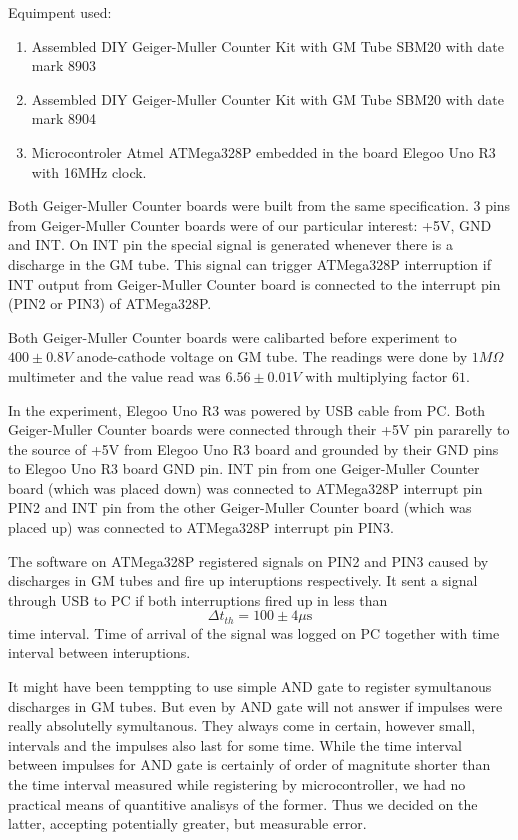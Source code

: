\documentclass[main.tex]{subfiles}
\begin{document}
 
Equimpent used:
\begin{enumerate}
\item Assembled DIY Geiger-Muller Counter Kit with GM Tube SBM20 with date mark 8903 
\item Assembled DIY Geiger-Muller Counter Kit with GM Tube SBM20 with date mark 8904
\item Microcontroler Atmel ATMega328P embedded in the board Elegoo Uno R3 with 16MHz clock.
\end{enumerate}

Both Geiger-Muller Counter boards were built from the same specification. 3 pins from Geiger-Muller Counter boards were of our particular interest: +5V, GND and INT. On INT pin the special signal is generated whenever there is a discharge in the GM tube. This signal can trigger ATMega328P interruption if INT output from Geiger-Muller Counter board is connected to the interrupt pin (PIN2 or PIN3) of ATMega328P.

Both Geiger-Muller Counter boards were calibarted before experiment to $400\pm 0.8V$  anode-cathode voltage on GM tube. The readings were done by $1M\Omega$ multimeter and the value read was $6.56\pm 0.01V$ with multiplying factor $61$. 

In the experiment, Elegoo Uno R3 was powered by USB cable from PC. Both Geiger-Muller Counter boards were connected through their +5V pin pararelly to the source of +5V from Elegoo Uno R3 board and grounded by their GND pins to Elegoo Uno R3 board GND pin. INT pin from one Geiger-Muller Counter board (which was placed down) was connected to ATMega328P interrupt pin PIN2 and INT pin from the other Geiger-Muller Counter board (which was placed up) was connected to ATMega328P interrupt pin PIN3.

The software on ATMega328P registered signals on PIN2 and PIN3 caused by discharges in GM tubes and fire up interuptions respectively. It sent a signal through USB to PC if both interruptions fired up in less than
\begin{equation}
\Delta t_{th} = 100\pm 4 \mu \text{s}
\end{equation} time interval. Time of arrival of the signal was logged on PC together with time interval between interuptions.

It might have been temppting to use simple AND gate to register symultanous discharges in GM tubes. But even by AND gate will not answer if impulses were really absolutelly symultanous. They always come in certain, however small, intervals and the impulses also last for some time. While the time interval between impulses for AND gate is certainly of order of magnitute shorter than the time interval measured while registering by microcontroller, we had no practical means of quantitive analisys of the former. Thus we decided on the latter, accepting potentially greater, but measurable error.  
  
\end{document}
